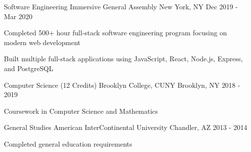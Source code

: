 

\begin{cventries}

  \cventry
    {Software Engineering Immersive} %
    {General Assembly} %
    {New York, NY} %
    {Dec 2019 - Mar 2020} %
    {
      \begin{cvitems} %
        \item {Completed 500+ hour full-stack software engineering program focusing on modern web development}
        \item {Built multiple full-stack applications using JavaScript, React, Node.js, Express, and PostgreSQL}
      \end{cvitems}
    }

  \cventry
    {Computer Science (12 Credits)} %
    {Brooklyn College, CUNY} %
    {Brooklyn, NY} %
    {2018 - 2019} %
    {
      \begin{cvitems} %
        \item {Coursework in Computer Science and Mathematics}
      \end{cvitems}
    }

  \cventry
    {General Studies} %
    {American InterContinental University} %
    {Chandler, AZ} %
    {2013 - 2014} %
    {
      \begin{cvitems} %
        \item {Completed general education requirements}
      \end{cvitems}
    }

\end{cventries}
